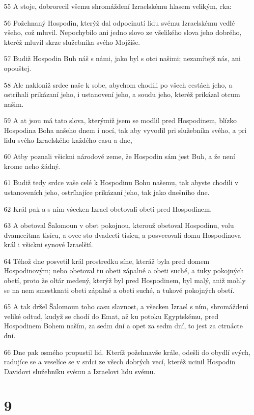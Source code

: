 \par 55 A stoje, dobrorecil všemu shromáždení Izraelskému hlasem velikým, rka:
\par 56 Požehnaný Hospodin, kterýž dal odpocinutí lidu svému Izraelskému vedlé všeho, což mluvil. Nepochybilo ani jedno slovo ze všelikého slova jeho dobrého, kteréž mluvil skrze služebníka svého Mojžíše.
\par 57 Budiž Hospodin Buh náš s námi, jako byl s otci našimi; nezamítejž nás, ani opouštej.
\par 58 Ale nakloniž srdce naše k sobe, abychom chodili po všech cestách jeho, a ostríhali prikázaní jeho, i ustanovení jeho, a soudu jeho, kteréž prikázal otcum našim.
\par 59 A at jsou má tato slova, kterýmiž jsem se modlil pred Hospodinem, blízko Hospodina Boha našeho dnem i nocí, tak aby vyvodil pri služebníka svého, a pri lidu svého Izraelského každého casu a dne,
\par 60 Atby poznali všickni národové zeme, že Hospodin sám jest Buh, a že není krome neho žádný.
\par 61 Budiž tedy srdce vaše celé k Hospodinu Bohu našemu, tak abyste chodili v ustanoveních jeho, ostríhajíce prikázaní jeho, tak jako dnešního dne.
\par 62 Král pak a s ním všecken Izrael obetovali obeti pred Hospodinem.
\par 63 A obetoval Šalomoun v obet pokojnou, kterouž obetoval Hospodinu, volu dvamecítma tisícu, a ovec sto dvadceti tisícu, a posvecovali domu Hospodinova král i všickni synové Izraelští.
\par 64 Téhož dne posvetil král prostredku síne, kteráž byla pred domem Hospodinovým; nebo obetoval tu obeti zápalné a obeti suché, a tuky pokojných obetí, proto že oltár medený, kterýž byl pred Hospodinem, byl malý, aniž mohly se na nem smestknati obeti zápalné a obeti suché, a tukové pokojných obetí.
\par 65 A tak držel Šalomoun toho casu slavnost, a všecken Izrael s ním, shromáždení veliké odtud, kudyž se chodí do Emat, až ku potoku Egyptskému, pred Hospodinem Bohem naším, za sedm dní a opet za sedm dní, to jest za ctrnácte dní.
\par 66 Dne pak osmého propustil lid. Kteríž požehnavše krále, odešli do obydlí svých, radujíce se a veselíce se v srdci ze všech dobrých vecí, kteréž ucinil Hospodin Davidovi služebníku svému a Izraelovi lidu svému.

\chapter{9}

